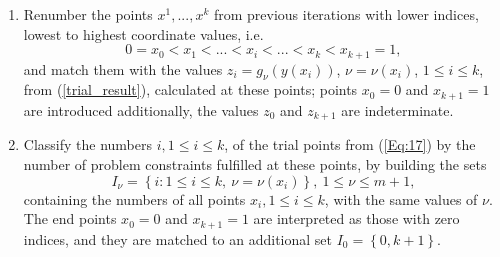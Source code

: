 \documentclass{llncs}
\begin{document}
\begin{enumerate}
\item 
Renumber the points $x^1,...,x^k$ from previous iterations with lower indices, lowest to highest 
coordinate values, i.e.
\begin{equation}\label{Eq:17}
0=x_0<x_1<...<x_i<...<x_k<x_{k+1}=1,
\end{equation}
and match them with the values $z_i=g_\nu(y(x_i))$, $\nu=\nu(x_i)$, $1 \leq i \leq k$, from 
(\ref{trial_result}), calculated at these points; points $x_0=0$ and $x_{k+1}=1$ are introduced 
additionally, the values $z_0$ and $z_{k+1}$ are indeterminate.
\item
Classify the numbers $i,1\leq i \leq k$, of the trial points from (\ref{Eq:17}) by the number of 
problem constraints fulfilled at these points, by building the sets
\begin{equation}\label{Eq:18}
I_\nu = \left\{i: 1 \leq i \leq k,\ \nu = \nu(x_i)\right\},\ 1 \leq \nu \leq m+1,
\end{equation}
containing the numbers of all points $x_i,1\leq i \leq k$, with the same values of $\nu$. The end 
points $x_0=0$ and $x_{k+1}=1$ are interpreted as those with zero indices, and they are 
matched to an additional set $I_0= \left\{ 0,k+1 \right\}$. 


\end{enumerate}
\end{document}
